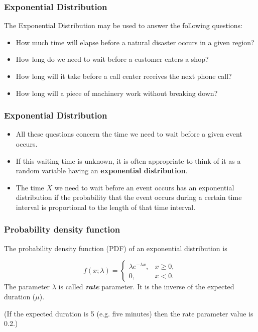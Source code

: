 \documentclass[IntroMain.tex]{subfiles}
\begin{document}
\begin{frame}[fragile]
\frametitle{Exponential Distribution}
\Large
The Exponential Distribution may be used to answer the following questions:
\begin{itemize}
\item How much time will elapse before a natural disaster occurs in a given region?
\item How long do we need to wait before a customer enters a shop?
\item How long will it take before a call center receives the next phone call?
\item How long will a piece of machinery work without breaking down?
\end{itemize}
\end{frame}
\begin{frame}[fragile]
\frametitle{Exponential Distribution}
\Large
\begin{itemize}
\item All these questions concern the time we need to wait before a given event occurs. 
\item If this waiting time is unknown, it is often appropriate to think of it as a random variable having an \textbf{exponential distribution}.
\item The time $X$ we need to wait before an event occurs has an exponential distribution if the probability that the event occurs during a certain time interval is proportional to the length of that time interval.

\end{itemize}
\end{frame}

\begin{frame}[fragile]
\frametitle{Probability density function}
\Large
The probability density function (PDF) of an exponential distribution is

\[
f(x;\lambda) = \begin{cases}
\lambda e^{-\lambda x}, & x \ge 0, \\
0, & x < 0.
\end{cases}\]
The parameter $\lambda$  is called \textbf{\emph{rate}} parameter. It is the inverse of the expected duration ($\mu$).\\ \bigskip

(If the expected duration is 5 (e.g. five minutes) then the rate parameter value is 0.2.)
\end{frame}
\end{document}
